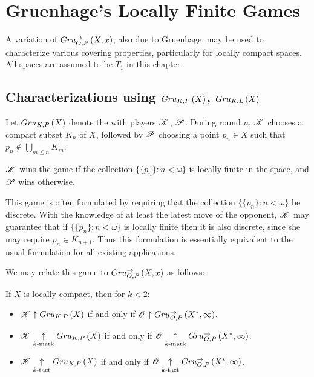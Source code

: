 
\chapter{Gruenhage's Locally Finite Games}

A variation of $Gru_{O,P}^{\to}\left({X},{x}\right)$, also due to Gruenhage,
may be used to characterize various covering properties, particularly
for locally compact spaces. All spaces are assumed to be $T_1$ in this
chapter.

\section{Characterizations using $Gru_{K,P}\left({X}\right)$, $Gru_{K,L}\left({X}\right)$}

\begin{game}
  Let $Gru_{K,P}\left({X}\right)$ denote the 
  with players $\mathscr{K}$, $\mathscr{P}$. During round $n$, $\mathscr{K}$ chooses
  a compact subset $K_n$ of $X$, followed by $\mathscr{P}$ choosing a point
  $p_n\in X$ such that $p_n\not\in \bigcup_{m\leq n}K_m$.

  $\mathscr{K}$ wins the game if the collection $\{\{p_n\}:n<\omega\}$ is locally
  finite in the space, and $\mathscr{P}$ wins otherwise.
\end{game}

This game is often formulated by requiring that the collection
$\{\{p_n\}:n<\omega\}$ be discrete. With the knowledge of at least the latest
move of the opponent, $\mathscr{K}$ may guarantee that if $\{\{p_n\}:n<\omega\}$
is locally finite then it is also discrete, since she may require
$p_n\in K_{n+1}$. Thus this formulation is essentially equivalent to the usual
formulation for all existing applications.

We may relate this game to $Gru_{O,P}^{\to}\left({X},{x}\right)$ as follows:

\begin{thm}
  If $X$ is locally compact, then for $k<2$:
    \begin{itemize}
      \item $\mathscr{K}\uparrow Gru_{K,P}\left({X}\right)$ if and only if
        $\mathscr{O}\uparrow Gru_{O,P}^{\to}\left({X^*},{\infty}\right)$.
      \item $\mathscr{K}\underset{k\text{-mark}}{\uparrow}Gru_{K,P}\left({X}\right)$ if and only if
        $\mathscr{O}\underset{k\text{-mark}}{\uparrow}Gru_{O,P}^{\to}\left({X^*},{\infty}\right)$.
      \item $\mathscr{K}\underset{k\text{-tact}}{\uparrow}Gru_{K,P}\left({X}\right)$ if and only if
        $\mathscr{O}\underset{k\text{-tact}}{\uparrow}Gru_{O,P}^{\to}\left({X^*},{\infty}\right)$.
    \end{itemize}
\end{thm}

